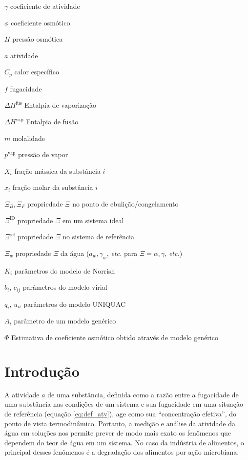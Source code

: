 \documentclass[
	12pt,				%
	openright,
	twoside,
	a4paper,			%
	english,			%
	french,				%
	brazil				%
	]{abntex2}
\begin{document}
\begin{simbolos}
	\item[$ \gamma $] coeficiente de atividade
	\item[$ \phi $] coeficiente osmótico
	\item[$ \Pi $] pressão osmótica
	\item[$ a $] atividade
	\item[$ C_p $] calor específico
	\item[$ f $] fugacidade
	\item[$ \Delta H^\text{fus} $] Entalpia de vaporização
	\item[$ \Delta H^\text{vap} $] Entalpia de fusão
	\item[$ m $] molalidade
	\item[$ p^\text{vap} $] pressão de vapor
	\item[$ X_i $] fração mássica da substância $i$
	\item[$ x_i $] fração molar da substância $i$
	\item[$ \Xi_B, \Xi_F $] propriedade $\Xi$ no ponto de ebulição/congelamento
	\item[$ \Xi^\text{ID} $] propriedade $\Xi$ em um sistema ideal
	\item[$ \Xi^\text{ref} $] propriedade $\Xi$ no sistema de referência
	\item[$ \Xi_w $] propriedade $\Xi$ da água ($a_w, \gamma_w$, \textit{etc.} %
		para $\Xi = \alpha, \gamma$, \textit{etc.})
	\item[$K_i$] parâmetros do modelo de Norrish
	\item[$b_i$, $c_{ij}$] parâmetros do modelo virial
	\item[$q_i$, $u_{ii}$] parâmetros do modelo UNIQUAC
	\item[$A_i$] parâmetro de um modelo genérico
	\item[$\Phi$] Estimativa de coeficiente osmótico obtido através de %
		modelo genérico
\end{simbolos}

\tableofcontents*
\cleardoublepage

\textual

\part{Introdução}

A atividade $a$ de uma substância, definida \cite{sandler2017} como
a razão entre a fugacidade de uma substância nas condições de um sistema
e sua fugacidade em uma situação de referência (equação \ref{eq:def_atv}),
age como sua ``concentração efetiva'', do ponto de vista termodinâmico.
Portanto, a medição e análise da atividade da água em soluções nos permite
prever de modo mais exato os fenômenos que dependem do teor de água em
um sistema. No caso da indústria de alimentos, o principal desses fenômenos
é a degradação dos alimentos por ação microbiana.
\end{document}
